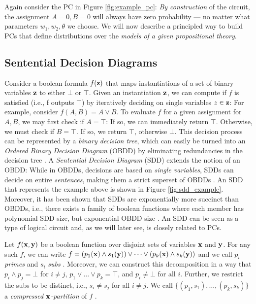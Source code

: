Again consider the PC in Figure \ref{fig:example_pc}: \textit{By construction} of the circuit, the assignment $A=0, B=0$ will always have zero probability --- no matter what parameters $w_1, w_2, \theta$ we choose.
We will now describe a principled way to build PCs that define distributions over the \textit{models of a given propositional theory}.

\subsection{Sentential Decision Diagrams}
Consider a boolean formula $f(\mathbf{z})$ that maps instantiations of a set of binary variables $\mathbf{z}$ to either $\bot$ or $\top$. Given an instantiation $\mathbf{z}$, we can compute if $f$ is satisfied (i.e., f outputs $\top$) by iteratively deciding on single variables $z \in \mathbf{z}$: For example, consider $f(A,B) = A \lor B$. To evaluate $f$ for a given assignment for $A,B$, we may first check if $A = \top$: If so, we can immediately return $\top$. Otherwise, we must check if $B = \top$. If so, we return $\top$, otherwise $\bot$. This decision process can be represented by a \emph{binary decision tree}, which can easily be turned into an \emph{Ordered Binary Decision Diagram} (OBDD) by eliminating redundancies in the decision tree \cite{obdd}.
A \emph{Sentential Decision Diagram} (SDD) extends the notion of an OBDD: While in OBDDs, decisions are based on \emph{single variables}, SDDs can decide on entire \textit{sentences}, making them a strict superset of OBDDs \cite{sdd}. An SDD that represents the example above is shown in Figure \ref{fig:sdd_example}. Moreover, it has been shown that SDDs are exponentially more succinct than OBDDs, i.e., there exists a family of boolean functions where each member has polynomial SDD size, but exponential OBDD size \cite{sdd_vs_obdd}. An SDD can be seen as a type of logical circuit and, as we will later see, is closely related to PCs.

\begin{definition}
Let $f(\mathbf{x}, \mathbf{y})$ be a boolean function over disjoint sets of variables $\mathbf{x}$ and $\mathbf{y}$. For any such $f$, we can write $f = (p_1(\mathbf{x}) \land s_1(\mathbf{y})) \lor \dots \lor (p_k(\mathbf{x}) \land s_k(\mathbf{y}))$ and we call $p_i$ \textit{primes} and $s_i$ \textit{subs} \cite{sdd, psdd}. Moreover, we can construct this decomposition in a way that $p_i \land p_j = \bot$ for $i \neq j$, $p_1 \lor \dots \lor p_k = \top$, and $p_i \neq \bot$ for all $i$. Further, we restrict the subs to be distinct, i.e., $s_i \neq s_j$ for all $i \neq j$. We call $\{(p_1,s_1),\dots,(p_k,s_k)\}$ a \textit{compressed $\mathbf{x}$-partition} of $f$ \cite{sdd}.
\end{definition}

